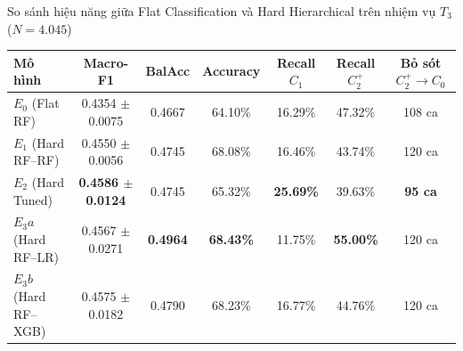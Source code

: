 \begin{table}{So sánh hiệu năng giữa Flat Classification và Hard Hierarchical trên nhiệm vụ $T_3$ ($N = 4.045$)}
\centering
\small
\label{tab:hard-hierarchical-results}
\begin{tabular}{l c c c c c c}
\toprule
\textbf{Mô hình} & \textbf{Macro-F1} & \textbf{BalAcc} & \textbf{Accuracy} & \textbf{Recall $C_1$} & \textbf{Recall $C_2^+$} & \textbf{Bỏ sót $C_2^+ \to C_0$} \\
\midrule
$E_0$ (Flat RF)       & 0.4354 $\pm$ 0.0075 & 0.4667 & 64.10\% & 16.29\% & 47.32\% & 108 ca \\
$E_1$ (Hard RF--RF)   & 0.4550 $\pm$ 0.0056 & 0.4745 & 68.08\% & 16.46\% & 43.74\% & 120 ca \\
$E_2$ (Hard Tuned)    & \textbf{0.4586 $\pm$ 0.0124} & 0.4745 & 65.32\% & \textbf{25.69\%} & 39.63\% & \textbf{95 ca} \\
$E_3a$ (Hard RF--LR)  & 0.4567 $\pm$ 0.0271 & \textbf{0.4964} & \textbf{68.43\%} & 11.75\% & \textbf{55.00\%} & 120 ca \\
$E_3b$ (Hard RF--XGB) & 0.4575 $\pm$ 0.0182 & 0.4790 & 68.23\% & 16.77\% & 44.76\% & 120 ca \\
\bottomrule
\end{tabular}
\end{table}
